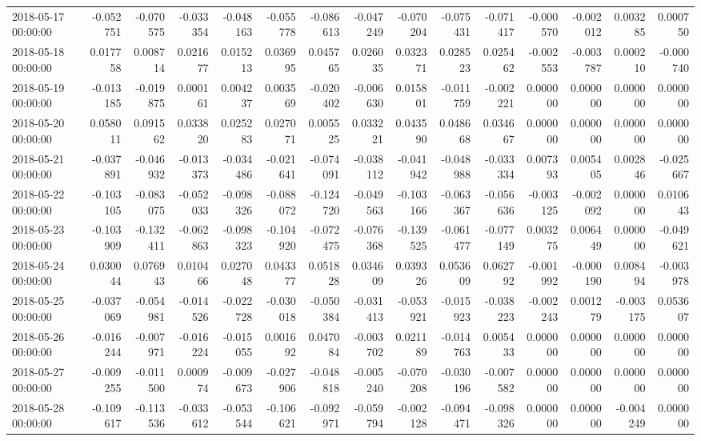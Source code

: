 \begin{tabular}{lrrrrrrrrrrrrrr}
2018-05-17 00:00:00 & -0.052751 & -0.070575 & -0.033354 & -0.048163 & -0.055778 & -0.086613 & -0.047249 & -0.070204 & -0.075431 & -0.071417 & -0.000570 & -0.002012 & 0.003285 & 0.000750 \\
2018-05-18 00:00:00 & 0.017758 & 0.008714 & 0.021677 & 0.015213 & 0.036995 & 0.045765 & 0.026035 & 0.032371 & 0.028523 & 0.025462 & -0.002553 & -0.003787 & 0.000210 & -0.000740 \\
2018-05-19 00:00:00 & -0.013185 & -0.019875 & 0.000161 & 0.004237 & 0.003569 & -0.020402 & -0.006630 & 0.015801 & -0.011759 & -0.002221 & 0.000000 & 0.000000 & 0.000000 & 0.000000 \\
2018-05-20 00:00:00 & 0.058011 & 0.091562 & 0.033820 & 0.025283 & 0.027071 & 0.005525 & 0.033221 & 0.043590 & 0.048668 & 0.034667 & 0.000000 & 0.000000 & 0.000000 & 0.000000 \\
2018-05-21 00:00:00 & -0.037891 & -0.046932 & -0.013373 & -0.034486 & -0.021641 & -0.074091 & -0.038112 & -0.041942 & -0.048988 & -0.033334 & 0.007393 & 0.005405 & 0.002846 & -0.025667 \\
2018-05-22 00:00:00 & -0.103105 & -0.083075 & -0.052033 & -0.098326 & -0.088072 & -0.124720 & -0.049563 & -0.103166 & -0.063367 & -0.056636 & -0.003125 & -0.002092 & 0.000000 & 0.010643 \\
2018-05-23 00:00:00 & -0.103909 & -0.132411 & -0.062863 & -0.098323 & -0.104920 & -0.072475 & -0.076368 & -0.139525 & -0.061477 & -0.077149 & 0.003275 & 0.006449 & 0.000000 & -0.049621 \\
2018-05-24 00:00:00 & 0.030044 & 0.076943 & 0.010466 & 0.027048 & 0.043377 & 0.051828 & 0.034609 & 0.039326 & 0.053609 & 0.062792 & -0.001992 & -0.000190 & 0.008494 & -0.003978 \\
2018-05-25 00:00:00 & -0.037069 & -0.054981 & -0.014526 & -0.022728 & -0.030018 & -0.050384 & -0.031413 & -0.053921 & -0.015923 & -0.038223 & -0.002243 & 0.001279 & -0.003175 & 0.053607 \\
2018-05-26 00:00:00 & -0.016244 & -0.007971 & -0.016224 & -0.015055 & 0.001692 & 0.047084 & -0.003702 & 0.021189 & -0.014763 & 0.005433 & 0.000000 & 0.000000 & 0.000000 & 0.000000 \\
2018-05-27 00:00:00 & -0.009255 & -0.011500 & 0.000974 & -0.009673 & -0.027906 & -0.048818 & -0.005240 & -0.070208 & -0.030196 & -0.007582 & 0.000000 & 0.000000 & 0.000000 & 0.000000 \\
2018-05-28 00:00:00 & -0.109617 & -0.113536 & -0.033612 & -0.053544 & -0.106621 & -0.092971 & -0.059794 & -0.002128 & -0.094471 & -0.098326 & 0.000000 & 0.000000 & -0.004249 & 0.000000 \\

\end{tabular}
